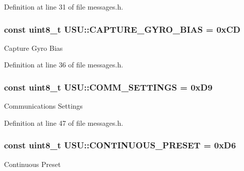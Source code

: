 \-Definition at line 31 of file messages.\-h.

\hypertarget{namespace_u_s_u_a92bab9f2a72649fb48c86fd407ef8c59}{
\subsubsection[{\-C\-A\-P\-T\-U\-R\-E\-\_\-\-G\-Y\-R\-O\-\_\-\-B\-I\-A\-S}]{\setlength{\rightskip}{0pt plus 5cm}const uint8\-\_\-t {\bf \-U\-S\-U\-::\-C\-A\-P\-T\-U\-R\-E\-\_\-\-G\-Y\-R\-O\-\_\-\-B\-I\-A\-S} = 0x\-C\-D}}\label{namespace_u_s_u_a92bab9f2a72649fb48c86fd407ef8c59}
\-Capture \-Gyro \-Bias 

\-Definition at line 36 of file messages.\-h.

\hypertarget{namespace_u_s_u_a3709ea83b0ef142216dad235ed73a34b}{
\subsubsection[{\-C\-O\-M\-M\-\_\-\-S\-E\-T\-T\-I\-N\-G\-S}]{\setlength{\rightskip}{0pt plus 5cm}const uint8\-\_\-t {\bf \-U\-S\-U\-::\-C\-O\-M\-M\-\_\-\-S\-E\-T\-T\-I\-N\-G\-S} = 0x\-D9}}\label{namespace_u_s_u_a3709ea83b0ef142216dad235ed73a34b}
\-Communications \-Settings 

\-Definition at line 47 of file messages.\-h.

\hypertarget{namespace_u_s_u_a5bc881189e111127f0bd759100dbab6b}{
\subsubsection[{\-C\-O\-N\-T\-I\-N\-U\-O\-U\-S\-\_\-\-P\-R\-E\-S\-E\-T}]{\setlength{\rightskip}{0pt plus 5cm}const uint8\-\_\-t {\bf \-U\-S\-U\-::\-C\-O\-N\-T\-I\-N\-U\-O\-U\-S\-\_\-\-P\-R\-E\-S\-E\-T} = 0x\-D6}}\label{namespace_u_s_u_a5bc881189e111127f0bd759100dbab6b}
\-Continuous \-Preset 


